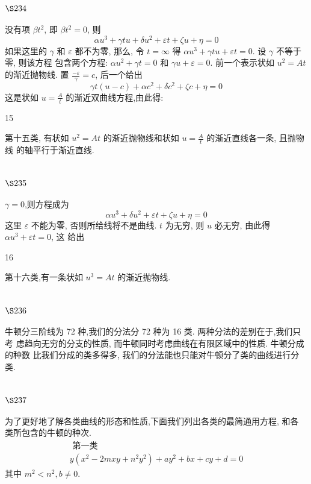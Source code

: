 \section{$\S 234$}

没有项 $\beta t^{2}$, 即 $\beta t^{2}=0$, 则
\[
\alpha u^{3}+\gamma t u+\delta u^{2}+\varepsilon t+\zeta u+\eta=0
\]
如果这里的 $\gamma$ 和 $\varepsilon$ 都不为零, 那么, 令 $t=\infty$ 得 $\alpha u^{3}+\gamma t u+\varepsilon t=0$. 设 $\gamma$ 不等于零, 则该方程 包含两个方程: $\alpha u^{2}+\gamma t=0$ 和 $\gamma u+\varepsilon=0$. 前一个表示状如 $u^{2}=A t$ 的渐近抛物线. 置 $\frac{-\varepsilon}{\gamma}=c$, 后一个给出 
\[
\gamma t(u-c)+\alpha c^{2}+\delta c^{2}+\zeta c+\eta=0
\]
这是状如 $u=\frac{A}{t}$ 的渐近双曲线方程,由此得:

15

第十五类, 有状如 $u^{2}=A t$ 的渐近抛物线和状如 $u=\frac{A}{t}$ 的渐近直线各一条, 且抛物线 的轴平行于渐近直线.

\section{$\S 235$}

$\gamma=0$,则方程成为
\[
\alpha u^{3}+\delta u^{2}+\varepsilon t+\zeta u+\eta=0
\]
这里 $\varepsilon$ 不能为零, 否则所给线将不是曲线. $t$ 为无穷, 则 $u$ 必无穷, 由此得 $\alpha u^{3}+\varepsilon t=0$, 这 给出

16

第十六类,有一条状如 $u^{3}=A t$ 的渐近抛物线.

\section{$\S 236$}

牛顿分三阶线为 72 种,我们的分法分 72 种为 16 类. 两种分法的差别在于,我们只考 虑趋向无穷的分支的性质, 而牛顿同时考虑曲线在有限区域中的性质. 牛顿分成的种数 比我们分成的类多得多, 我们的分法能也只能对牛顿分了类的曲线进行分类.

\section{$\S 237$}

为了更好地了解各类曲线的形态和性质,下面我们列出各类的最简通用方程, 和各 类所包含的牛顿的种次.
\[
\begin{gathered}
\text { 第一类 } \\
y\left(x^{2}-2 m x y+n^{2} y^{2}\right)+a y^{2}+b x+c y+d=0
\end{gathered}
\]
其中 $m^{2}<n^{2}, b \neq 0$.

